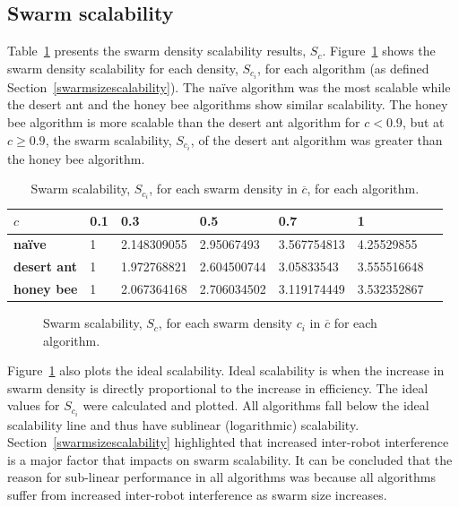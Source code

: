 \subsection{Swarm scalability}
\label{results:swarmscalability}

Table~\ref{table:swarmscalability} presents the swarm density scalability results, $S_c$. Figure~\ref{fig:swarmscalability} shows the swarm density scalability for each density, $S_{c_i}$, for each algorithm (as defined Section~\ref{swarmsizescalability}). The na\"ive algorithm was the most scalable while the desert ant and the honey bee algorithms show similar scalability. The honey bee algorithm is more scalable than the desert ant algorithm for $c < 0.9$, but at $c \geq 0.9$, the swarm scalability, $S_{c_i}$, of the desert ant algorithm was greater than the honey bee algorithm.

\begin{table}[!htbp]
\centering
\caption{Swarm scalability, $S_{c_i}$, for each swarm density in $\overline{c}$, for each algorithm.}
\label{table:swarmscalability}
\begin{tabular}{@{}lllllll@{}}
\toprule
\textbf{$c$}            & \textbf{0.1} & \textbf{0.3}         & \textbf{0.5}         & \textbf{0.7}         & \textbf{1}           \\ \midrule
\textbf{na\"ive}    & 1   & 2.148309055 & 2.95067493  & 3.567754813 & 4.25529855  \\
\textbf{desert ant} & 1   & 1.972768821 & 2.604500744 & 3.05833543  & 3.555516648 \\
\textbf{honey bee}  & 1   & 2.067364168 & 2.706034502 & 3.119174449 & 3.532352867 \\ \bottomrule
\end{tabular}
\end{table}

\begin{figure}[!htbp]
\centering
\small
\resizebox{\textwidth}{!}{}
\caption{Swarm scalability, $S_c$, for each swarm density $c_i$ in $\overline{c}$ for each algorithm.}
\label{fig:swarmscalability}
\end{figure}

Figure~\ref{fig:swarmscalability} also plots the ideal scalability. Ideal scalability is when the increase in swarm density is directly proportional to the increase in efficiency. The ideal values for $S_{c_i}$ were calculated and plotted. All algorithms fall below the ideal scalability line and thus have sublinear (logarithmic) scalability. Section~\ref{swarmsizescalability} highlighted that increased inter-robot interference is a major factor that impacts on swarm scalability. It can be concluded that the reason for sub-linear performance in all algorithms was because all algorithms suffer from increased inter-robot interference as swarm size increases.

